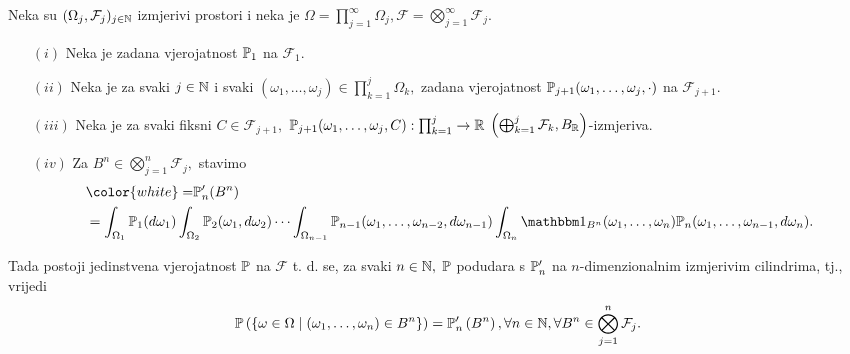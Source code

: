 \documentclass{article}
\begin{document}
Neka su \((\Omega_j,\mathcal F_j)_{j\in\Bbb N}\) izmjerivi prostori i neka je \(\displaystyle\Omega=\prod_{j=1}^\infty\Omega_j,\mathcal F=\bigotimes_{j=1}^\infty\mathcal F_j.\)
\begin{itemize}
    \item[\((i)\)] Neka je zadana vjerojatnost \(\Bbb P_1\) na \(\mathcal F_1.\)
    \item[\((ii)\)] Neka je za svaki \(j\in\Bbb N\) i svaki \((\omega_1,\ldots,\omega_j)\in\prod\limits_{k=1}^j\Omega_k,\) zadana vjerojatnost \(\Bbb P_{j+1}(\omega_1,\ldots,\omega_j,\cdot)\) na \(\mathcal F_{j+1}.\)
    \item[\((iii)\)] Neka je za svaki fiksni \(C\in\mathcal F_{j+1},\) \(\Bbb P_{j+1}(\omega_1,\ldots,\omega_j,C):\prod_{k=1}^j\to\Bbb R\) \(\left(\bigoplus_{k=1}^j\mathcal F_k, B_\Bbb R\right)\)-izmjeriva.
    \item[\((iv)\)] Za \(B^n\in\bigotimes_{j=1}^n\mathcal F_j,\) stavimo \[\begin{aligned}{}&{\color{white}=}\Bbb P_n'(B^n)\\&=\int_{\Omega_1}\Bbb P_1(d\omega_1)\int_{\Omega_2}\Bbb P_2(\omega_1,d\omega_2)\cdots\int_{\Omega_{n-1}}\Bbb P_{n-1}(\omega_1,\ldots,\omega_{n-2},d\omega_{n-1})\int_{\Omega_n}\mathbbm 1_{B^n}(\omega_1,\ldots,\omega_n)\Bbb P_n(\omega_1,\ldots,\omega_{n-1},d\omega_n).\end{aligned}\]
\end{itemize}
Tada postoji jedinstvena vjerojatnost \(\Bbb P\)
 na \(\mathcal F\) t. d. se, za svaki \(n\in\Bbb N,\) \(\Bbb P\) podudara s \(\Bbb P_n'\) na \(n\)-dimenzionalnim izmjerivim cilindrima, tj., vrijedi \[\Bbb P\left(\left\{\omega\in\Omega\mid(\omega_1,\ldots,\omega_n)\in B^n\right\}\right)=\Bbb P_n'\left(B^n\right),\forall n\in\Bbb N,\forall B^n\in\bigotimes_{j=1}^n\mathcal F_j.\] 
\newpage
\end{document}
